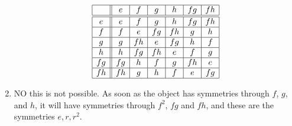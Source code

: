 \documentclass[noauthor,nooutcomes,hints]{ximera}
\begin{document}
\begin{question}
\begin{freeResponse}
\begin{enumerate}
\[\begin{array}{|c||c|c|c|c|c|c|}
        \hline
        & e  & f   & g  & h  & fg & fh  \\ \hline\hline
        e  & e  & f   & g  & h  & fg & fh  \\ \hline
        f  & f  & e   & fg & fh & g  & h   \\ \hline
        g  & g  & fh  & e  & fg & h  & f   \\ \hline
        h  & h  & fg  & fh & e  & f  & g   \\ \hline
        fg & fg & h   & f  & g  & fh & e   \\ \hline
        fh & fh & g   & h  & f  & e  & fg  \\ \hline
      \end{array}
      \]
    \item NO this is not possible. As soon as the object has
      symmetries through $f$, $g$, and $h$, it will have symmetries
      through $f^2$, $fg$ and $fh$, and these are the symmetries
      $e,r,r^2$.
    \end{enumerate}
  \end{freeResponse}
\end{question}
\end{document}
